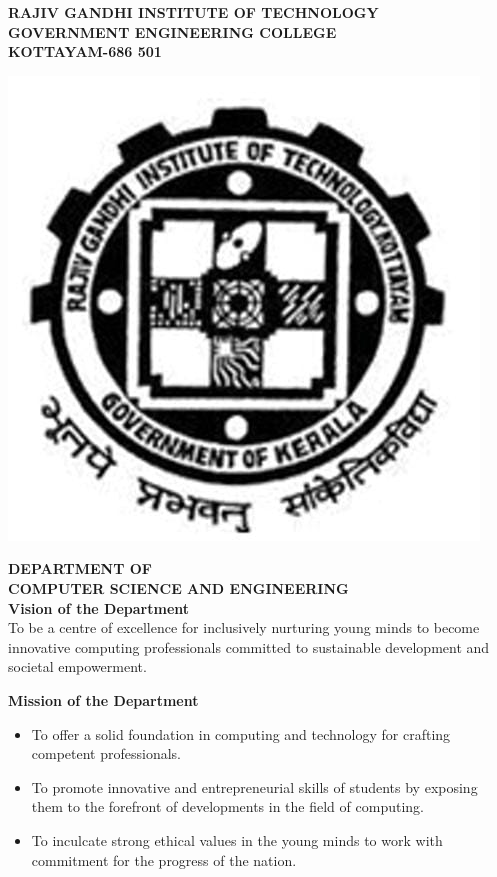 \newpage
\thispagestyle{empty}
\begin{center}
\Large\textbf{RAJIV GANDHI INSTITUTE OF TECHNOLOGY}
\vspace{10pt}
\\
\Large\textbf{GOVERNMENT ENGINEERING COLLEGE}\\
\vspace{10pt}
\Large\textbf{KOTTAYAM-686 501}\\
\vspace{10pt}
\begin{center}
\includegraphics[scale=0.25]{rit.jpg}
\end{center}
\vspace{5 pt}

\Large \textbf{DEPARTMENT OF \\COMPUTER SCIENCE AND ENGINEERING} 
\\
\vspace{50 pt}
\Large \textbf{Vision of the Department }\\
\vspace{10pt}
\normalsize{To be a centre of excellence for inclusively nurturing young minds to become innovative computing professionals committed to sustainable development and societal empowerment.}

\vspace{40 pt}

\Large \textbf{Mission of the Department }\\
\vspace{10pt}
\normalsize{
\begin{itemize}
\item{To offer a solid foundation in computing and technology for crafting competent professionals.}
\item{To promote innovative and entrepreneurial skills of students by exposing them to the forefront of developments in the field of computing.}
\item{To inculcate strong ethical values in the young minds to work with commitment for the progress of the nation.}
\end{itemize}
}


\end{center}